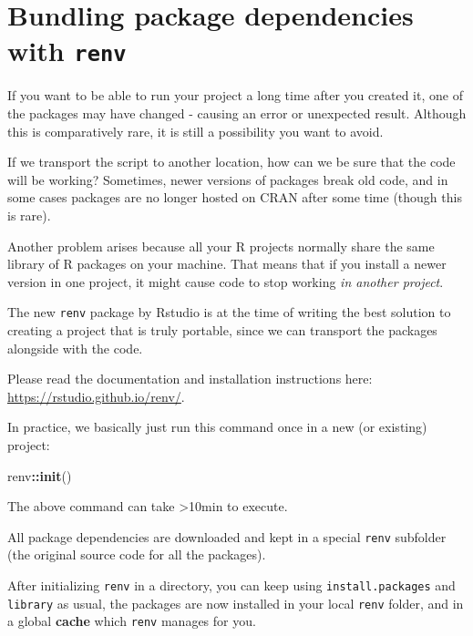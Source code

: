 \documentclass[]{book}
\newenvironment{Shaded}{\begin{snugshade}}{\end{snugshade}}
\newcommand{\KeywordTok}[1]{\textcolor[rgb]{0.13,0.29,0.53}{\textbf{#1}}}
\newcommand{\NormalTok}[1]{#1}
\newcommand{\OperatorTok}[1]{\textcolor[rgb]{0.81,0.36,0.00}{\textbf{#1}}}
\let\BeginKnitrBlock\begin \let\EndKnitrBlock\end
\begin{document}
\hypertarget{bundling-package-dependencies-with-renv}{%
\section{\texorpdfstring{Bundling package dependencies with \texttt{renv}}{Bundling package dependencies with renv}}\label{bundling-package-dependencies-with-renv}}

If you want to be able to run your project a long time after you created it, one of the packages may have changed - causing an error or unexpected result. Although this is comparatively rare, it is still a possibility you want to avoid.

If we transport the script to another location, how can we be sure that the code will be working? Sometimes, newer versions of packages break old code, and in some cases packages are no longer hosted on CRAN after some time (though this is rare).

Another problem arises because all your R projects normally share the same library of R packages on your machine. That means that if you install a newer version in one project, it might cause code to stop working \emph{in another project}.

The new \texttt{renv} package by Rstudio is at the time of writing the best solution to creating a project that is truly portable, since we can transport the packages alongside with the code.

\BeginKnitrBlock{rmdtry}
Please read the documentation and installation instructions here: \url{https://rstudio.github.io/renv/}.
\EndKnitrBlock{rmdtry}

In practice, we basically just run this command once in a new (or existing) project:

\begin{Shaded}
\begin{Highlighting}[]
\NormalTok{renv}\OperatorTok{::}\KeywordTok{init}\NormalTok{()}
\end{Highlighting}
\end{Shaded}

\BeginKnitrBlock{rmdcaution}
The above command can take \textgreater10min to execute.
\EndKnitrBlock{rmdcaution}

All package dependencies are downloaded and kept in a special \texttt{renv} subfolder (the original source code for all the packages).

After initializing \texttt{renv} in a directory, you can keep using \texttt{install.packages} and \texttt{library} as usual, the packages are now installed in your local \texttt{renv} folder, and in a global \textbf{cache} which \texttt{renv} manages for you.
\end{document}
